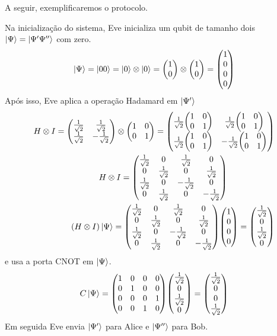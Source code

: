 \documentclass[a4paper, 12pt, oneside]{book}
\begin{document}
A seguir, exemplificaremos o protocolo.

Na inicialização do sistema, Eve inicializa um qubit de tamanho dois $\ket{\Psi}=\ket{\Psi' \Psi''}$ com zero. 
\begin{align*}
\ket{\Psi} = \ket{00} = \ket{0}\otimes \ket{0} = \mqty(1\\0) \otimes \mqty(1\\0) = \mqty(1\\0\\0\\0)
\end{align*}
Após isso, Eve aplica a operação Hadamard em $\ket{\Psi'}$
\begin{align*}
H \otimes I = \mqty(\frac{1}{\sqrt{2}}&\frac{1}{\sqrt{2}}\\
				\frac{1}{\sqrt{2}}&-\frac{1}{\sqrt{2}} ) 
	\otimes \mqty(1&0\\0&1) 
= \mqty(\frac{1}{\sqrt{2}}\mqty(1&0\\0&1) & \frac{1}{\sqrt{2}}\mqty(1&0\\0&1) \\ 
	\frac{1}{\sqrt{2}}\mqty(1&0\\0&1) & -\frac{1}{\sqrt{2}}\mqty(1&0\\0&1))
	\\
H \otimes I = 
\mqty(\frac{1}{\sqrt{2}}&0&\frac{1}{\sqrt{2}}&0\\
	0&\frac{1}{\sqrt{2}}&0&\frac{1}{\sqrt{2}} \\
	\frac{1}{\sqrt{2}}&0&-\frac{1}{\sqrt{2}}&0 \\
	0&\frac{1}{\sqrt{2}}&0&-\frac{1}{\sqrt{2}}) \hspace{2cm} \\
(H \otimes I)\ket{\Psi} =  \mqty(\frac{1}{\sqrt{2}}&0&\frac{1}{\sqrt{2}}&0\\
	0&\frac{1}{\sqrt{2}}&0&\frac{1}{\sqrt{2}} \\
	\frac{1}{\sqrt{2}}&0&-\frac{1}{\sqrt{2}}&0 \\
	0&\frac{1}{\sqrt{2}}&0&-\frac{1}{\sqrt{2}}) 
	\mqty(1\\0\\0\\0) = \mqty(\frac{1}{\sqrt{2}}\\0\\ \frac{1}{\sqrt{2}}\\0)
\end{align*}
e usa a porta CNOT em $\ket{\Psi}$.
\begin{align*}
C\ket{\Psi} = \mqty(1&0&0&0\\0&1&0&0\\0&0&0&1\\0&0&1&0) 
			\mqty(\frac{1}{\sqrt{2}}\\0\\ \frac{1}{\sqrt{2}}\\0)
		= \mqty(\frac{1}{\sqrt{2}}\\0\\ 0\\ \frac{1}{\sqrt{2}})
\end{align*}
Em seguida Eve envia $\ket{\Psi'}$ para Alice e $\ket{\Psi''}$ para Bob. 
\end{document}
